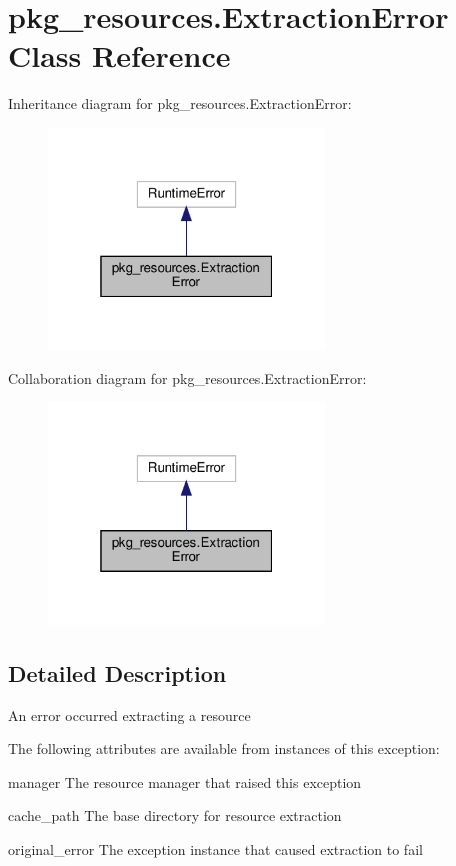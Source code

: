 \hypertarget{classpkg__resources_1_1ExtractionError}{}\section{pkg\+\_\+resources.\+Extraction\+Error Class Reference}
\label{classpkg__resources_1_1ExtractionError}


Inheritance diagram for pkg\+\_\+resources.\+Extraction\+Error\+:
\nopagebreak
\begin{figure}[H]
\begin{center}
\leavevmode
\includegraphics[width=208pt]{classpkg__resources_1_1ExtractionError__inherit__graph}
\end{center}
\end{figure}


Collaboration diagram for pkg\+\_\+resources.\+Extraction\+Error\+:
\nopagebreak
\begin{figure}[H]
\begin{center}
\leavevmode
\includegraphics[width=208pt]{classpkg__resources_1_1ExtractionError__coll__graph}
\end{center}
\end{figure}


\subsection{Detailed Description}
\begin{DoxyVerb}An error occurred extracting a resource

The following attributes are available from instances of this exception:

manager
    The resource manager that raised this exception

cache_path
    The base directory for resource extraction

original_error
    The exception instance that caused extraction to fail
\end{DoxyVerb}
 

